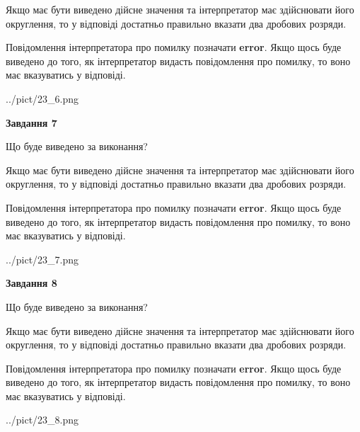 \documentclass[12pt, ukrainian]{article}
\begin{document}
{\begin {Large}
Якщо має бути виведено дійсне значення та інтерпретатор має здійснювати його округлення, 
то у відповіді достатньо правильно вказати два дробових розряди.

Повідомлення інтерпретатора про помилку позначати \textbf{error}.
Якщо щось буде виведено до того, як інтерпретатор видасть повідомлення про помилку, 
то воно має вказуватись у відповіді. \par

\begin{center}
	{../pict/23_6.png}
\end{center}
\newpage

{\begin {center}\textbf{Завдання 7}\end {center}}\par
Що буде виведено за виконання? \par

Якщо має бути виведено дійсне значення та інтерпретатор має здійснювати його округлення, 
то у відповіді достатньо правильно вказати два дробових розряди.

Повідомлення інтерпретатора про помилку позначати \textbf{error}.
Якщо щось буде виведено до того, як інтерпретатор видасть повідомлення про помилку, 
то воно має вказуватись у відповіді. \par

\begin{center}
	{../pict/23_7.png}
\end{center}
\newpage

{\begin {center}\textbf{Завдання 8}\end {center}}\par
Що буде виведено за виконання? \par

Якщо має бути виведено дійсне значення та інтерпретатор має здійснювати його округлення, 
то у відповіді достатньо правильно вказати два дробових розряди.

Повідомлення інтерпретатора про помилку позначати \textbf{error}.
Якщо щось буде виведено до того, як інтерпретатор видасть повідомлення про помилку, 
то воно має вказуватись у відповіді. \par

\begin{center}
	{../pict/23_8.png}
\end{center}
\newpage


\end{Large}}
\end{document}

